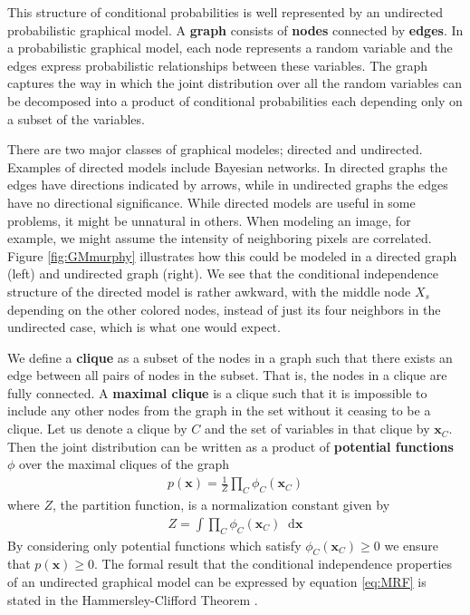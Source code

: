 \documentclass[twoside,english]{uiofysmaster}
\newcommand*\dif{\mathop{}\!\mathrm{d}}
\begin{document}
This structure of conditional probabilities is well represented by an undirected probabilistic graphical model. 
A \textbf{graph} consists of \textbf{nodes} connected by \textbf{edges}. In a probabilistic graphical model, each node represents a random variable and the edges express probabilistic relationships between these variables. The graph captures the way in which the joint distribution over all the random variables can be decomposed into a product of conditional probabilities each depending only on a subset of the variables.

There are two major classes of graphical modeles; directed and undirected. Examples of directed models include Bayesian networks. In directed graphs the edges have directions indicated by arrows, while in undirected graphs the edges have no directional significance.
While directed models are useful in some problems, it might be unnatural in others. When modeling an image, for example, we might assume the intensity of neighboring pixels are correlated. Figure \ref{fig:GMmurphy} illustrates how this could be modeled in a directed graph (left) and undirected graph (right). We see that the conditional independence structure of the directed model is rather awkward, with the middle node $X_s$ depending on the other colored nodes, instead of just its four neighbors in the undirected case, which is what one would expect.

We define a \textbf{clique} as a subset of the nodes in a graph such that there exists an edge between all pairs of nodes in the subset. That is, the nodes in a clique are fully connected. A \textbf{maximal clique} is a clique such that it is impossible to include any other nodes from the graph in the set without it ceasing to be a clique.
Let us denote a clique by $C$ and the set of variables in that clique by $\bm{x}_C$. Then the joint distribution can be written as a product of \textbf{potential functions} $\phi$ over the maximal cliques of the graph
\begin{align}
	p(\bm{x}) = \frac{1}{Z} \prod_C \phi_C (\bm{x}_C) \label{eq:MRF}
\end{align} 
where $Z$, the partition function, is a normalization constant given by
\begin{align}
	Z = \int \prod_C \phi_C (\bm{x}_C) \dif \bm{x}
\end{align}
By considering only potential functions which satisfy $\phi_C (\bm{x}_C) \geq 0$ we ensure that $p(\bm{x}) \geq 0$.
The formal result that the conditional independence properties of an undirected graphical model can be expressed by equation \ref{eq:MRF} is stated in the Hammersley-Clifford Theorem \cite{Murphy2012}.
\end{document}
